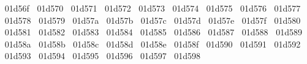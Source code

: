 {  ^^^^^^01d56f%
  ^^^^^^01d570%
  ^^^^^^01d571%
  ^^^^^^01d572%
  ^^^^^^01d573%
  ^^^^^^01d574%
  ^^^^^^01d575%
  ^^^^^^01d576%
  ^^^^^^01d577%
  ^^^^^^01d578%
  ^^^^^^01d579%
  ^^^^^^01d57a%
  ^^^^^^01d57b%
  ^^^^^^01d57c%
  ^^^^^^01d57d%
  ^^^^^^01d57e%
  ^^^^^^01d57f%
  ^^^^^^01d580%
  ^^^^^^01d581%
  ^^^^^^01d582%
  ^^^^^^01d583%
  ^^^^^^01d584%
  ^^^^^^01d585%
  ^^^^^^01d586%
  ^^^^^^01d587%
  ^^^^^^01d588%
  ^^^^^^01d589%
  ^^^^^^01d58a%
  ^^^^^^01d58b%
  ^^^^^^01d58c%
  ^^^^^^01d58d%
  ^^^^^^01d58e%
  ^^^^^^01d58f%
  ^^^^^^01d590%
  ^^^^^^01d591%
  ^^^^^^01d592%
  ^^^^^^01d593%
  ^^^^^^01d594%
  ^^^^^^01d595%
  ^^^^^^01d596%
  ^^^^^^01d597%
  ^^^^^^01d598%
}
